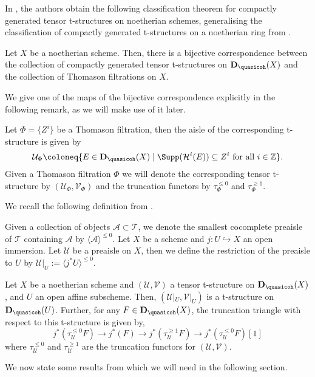 In \cite{sahoo2023compactly}, the authors obtain the following classification theorem for compactly generated tensor t-structures on noetherian schemes, generalising the classification of compactly generated t-structures on a noetherian ring from \cite{Alonso_Tarr_o_2010}.

\begin{citedthm}\label{Theorem 4.11 on Classification DS}
    
    Let $X$ be a noetherian scheme. Then, there is a bijective correspondence between the collection of compactly generated tensor t-structures on $\mathbf{D}_{\quasicoh}(X)$ and the collection of Thomason filtrations on $X$. 
\end{citedthm}

We give one of the maps of the bijective correspondence explicitly in the following remark, as we will make use of it later.
\begin{Rem}\label{Thomason filtration to tensor aisle}
    Let $\Phi = \{Z^i\}$ be a Thomason filtration, then the aisle of the corresponding t-structure is given by \[\mathcal{U}_\Phi \coloneq \{E \in \mathbf{D}_{\quasicoh}(X)\mid \Supp(\mathcal{H}^i(E)) \subseteq Z^i \text{ for all } i \in \mathbb{Z}\}.\]
    Given a Thomason filtration $\Phi$ we will denote the corresponding tensor t-structure by $(\mathcal{U}_\Phi, \mathcal{V}_\Phi)$ and the truncation functors by $\tau_{\Phi}^{\leq 0}$ and $ \tau_{\Phi}^{\geq 1}$.
\end{Rem}
We recall the following definition from \cite{sahoo2023compactly}.
\begin{Def}
    Given a collection of objects $\mathcal{A} \subset \mathcal{T}$, we denote the smallest cocomplete preaisle of $\mathcal{T}$ containing $\mathcal{A}$ by $\langle \mathcal{A}\rangle^{\leq 0}$. Let $X$ be a scheme and $j:U \hookrightarrow X$ an open immersion. Let $\mathcal{U}$ be a preaisle on $X$, then we define the restriction of the preaisle to $U$ by $\mathcal{U}|_U:=\langle j^\ast U\rangle^{\leq 0}$.   
\end{Def}

\begin{citedlemma}\label{Lemma 4.6 DS}
    Let $X$ be a noetherian scheme and $(\mathcal{U},\mathcal{V})$ a tensor t-structure on $\mathbf{D}_{\quasicoh}(X)$, and $U$ an open affine subscheme. Then, $(\mathcal{U}|_{U},\mathcal{V}|_{U})$ is a t-structure on $\mathbf{D}_{\quasicoh}(U)$. Further, for any $F \in \mathbf{D}_{\quasicoh}(X)$, the truncation triangle with respect to this t-structure is given by, \[j^*(\tau_{\mathcal{U}}^{\leq 0}F) \to j^*(F) \to j^*(\tau_{\mathcal{U}}^{\geq 1}F) \to j^*(\tau_{\mathcal{U}}^{\leq 0}F)[1]\]
    where $\tau_{\mathcal{U}}^{\leq 0}$ and $\tau_{\mathcal{U}}^{\geq 1}$ are the truncation functors for $(\mathcal{U},\mathcal{V})$.
\end{citedlemma}
We now state some results from \cite{smith2019bounded} which we will need in the following section.


